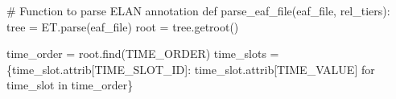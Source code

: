 \documentclass[
  letterpaper,
  DIV=11,
  numbers=noendperiod]{scrreprt}
\newenvironment{Shaded}{\begin{snugshade}}{\end{snugshade}}
\newcommand{\CommentTok}[1]{\textcolor[rgb]{0.37,0.37,0.37}{#1}}
\newcommand{\ControlFlowTok}[1]{\textcolor[rgb]{0.00,0.23,0.31}{#1}}
\newcommand{\KeywordTok}[1]{\textcolor[rgb]{0.00,0.23,0.31}{#1}}
\newcommand{\NormalTok}[1]{\textcolor[rgb]{0.00,0.23,0.31}{#1}}
\newcommand{\OperatorTok}[1]{\textcolor[rgb]{0.37,0.37,0.37}{#1}}
\newcommand{\StringTok}[1]{\textcolor[rgb]{0.13,0.47,0.30}{#1}}
\begin{document}
\begin{Shaded}
\begin{Highlighting}[]
\CommentTok{\# Function to parse ELAN annotation}
\KeywordTok{def}\NormalTok{ parse\_eaf\_file(eaf\_file, rel\_tiers):}
\NormalTok{    tree }\OperatorTok{=}\NormalTok{ ET.parse(eaf\_file)}
\NormalTok{    root }\OperatorTok{=}\NormalTok{ tree.getroot()}

\NormalTok{    time\_order }\OperatorTok{=}\NormalTok{ root.find(}\StringTok{\textquotesingle{}TIME\_ORDER\textquotesingle{}}\NormalTok{)}
\NormalTok{    time\_slots }\OperatorTok{=}\NormalTok{ \{time\_slot.attrib[}\StringTok{\textquotesingle{}TIME\_SLOT\_ID\textquotesingle{}}\NormalTok{]: time\_slot.attrib[}\StringTok{\textquotesingle{}TIME\_VALUE\textquotesingle{}}\NormalTok{] }\ControlFlowTok{for}\NormalTok{ time\_slot }\KeywordTok{in}\NormalTok{ time\_order\}}


\end{Highlighting}
\end{Shaded}
\end{document}
